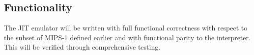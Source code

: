 \subsection{Functionality}

The JIT emulator will be written with full functional correctness with respect to the subset of MIPS-1 defined earlier and with functional parity to the interpreter. This will be verified through comprehensive testing.